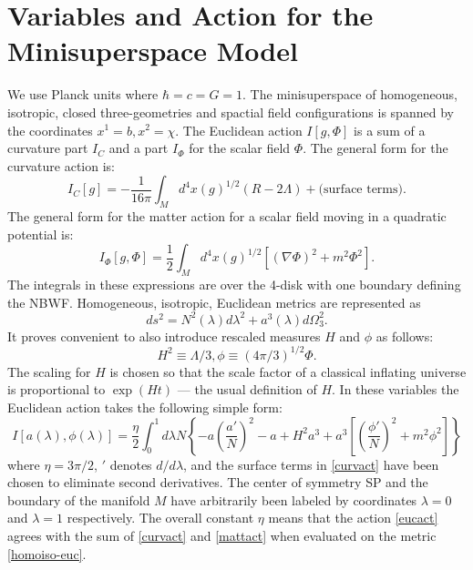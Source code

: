 \documentclass[prd,floats,superscriptaddress,eqsecnum,floatfix,nofootinbib,12pt]{revtex4}
\def\be{\begin{equation}}
\def\ee{\end{equation}}
\begin{document}
{{{{\appendix

\section{Variables and Action for the Minisuperspace Model}
\label{appa}

We use Planck units where $\hbar=c=G=1$. The minisuperspace of homogeneous, isotropic, closed three-geometries and spactial field configurations is spanned by the coordinates $x^1=b, x^2=\chi$.
The Euclidean action $I[g,\Phi]$ is a sum of a  curvature part $I_C$ and a part $I_\Phi$ for the scalar field $\Phi$.  The general form for the curvature action is: 
\begin{equation}
I_C[g] = -\frac{1}{16\pi}\int_M d^4 x (g)^{1/2}(R-2\Lambda) +\text{(surface terms)} .
\label{curvact}
\end{equation}
The general form for the matter action for a scalar field moving in a quadratic potential is:
\begin{equation}
I_{\Phi}[g,\Phi]=\frac{1}{2} \int_M d^4x (g)^{1/2}[(\nabla\Phi)^2 +m^2 \Phi^2] . 
\label{mattact}
\end{equation}
The integrals in these expressions are over the 4-disk with one boundary defining the NBWF. 
Homogeneous, isotropic, Euclidean metrics are represented as 
\be
ds^2 = 
N^2(\lambda) d\lambda^2 + a^3(\lambda) d\Omega^2_3 .
\label{homoiso-euc}
\ee
It proves convenient to also introduce rescaled measures $H$ and $\phi$ as follows: 
\begin{subequations}
\label{defs}
\begin{equation}
H^2 \equiv \Lambda/3 ,
\label{defH}
\end{equation}
\begin{equation}
\phi \equiv (4\pi/3)^{1/2} \Phi   .
\label{defphi}
\end{equation}
\end{subequations}
The scaling for $H$ is chosen so that the scale factor of a classical inflating universe is proportional to $\exp(H t)$ --- the usual definition of $H$. 
In these variables the Euclidean action takes the following simple form:
\begin{equation} 
I[a(\lambda),\phi(\lambda)] = \frac{\eta}{2}\int^1_0 d\lambda N \left\{ -a \left(\frac{a'}{N}\right)^2 -a +H^2a^3 +a^3\left[\left(\frac{\phi'}{N}\right)^2 + m^2\phi^2\right]\right\}
\label{eucact}
\end{equation}
where $\eta=3\pi/2$, $'$ denotes $d/d\lambda$, and the surface terms in \eqref{curvact} have been chosen to eliminate second derivatives.  The center of symmetry SP  and the boundary of the manifold $M$ have arbitrarily been labeled by coordinates $\lambda =0$ and $\lambda=1$ respectively. The overall  constant $\eta$ means that the action \eqref{eucact} agrees with the sum of \eqref{curvact} and \eqref{mattact} when evaluated on the metric \eqref{homoiso-euc}.

}}}}
\end{document}

